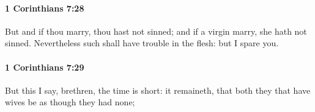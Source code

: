 		\paragraph{1 Corinthians 7:28} %
			\label{1CORINTHIANS-7-28}

			But and if thou marry, thou hast not sinned; and if a virgin marry, she hath not sinned.  Nevertheless such shall have trouble in the flesh: but I spare you.

			\begin{framed}
			\scriptsize
				\begin{compactdesc}
					\item[SBLG] 
				\end{compactdesc}
			\end{framed}

		\paragraph{1 Corinthians 7:29} %
			\label{1CORINTHIANS-7-29}

			But this I say, brethren, the time is short: it remaineth, that both they that have wives be as though they had none;

